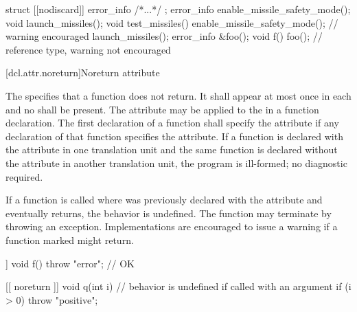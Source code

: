 \pnum
\enterexample
\begin{codeblock}
struct [[nodiscard]] error_info { /*...*/ };
error_info enable_missile_safety_mode();
void launch_missiles();
void test_missiles() {
  enable_missile_safety_mode(); // warning encouraged
  launch_missiles();
}
error_info &foo();
void f() { foo(); } // reference type, warning not encouraged
\end{codeblock}
\exitexample

[dcl.attr.noreturn]{Noreturn attribute}%

\pnum
The   specifies that a function does not return. It
shall appear at most once in each  and no
 shall be present. The attribute may be applied to the
 in a function declaration. The first declaration of a function shall
specify the  attribute if any declaration of that function specifies the
 attribute. If a function is declared with the  attribute in one
translation unit and the same function is declared without the  attribute in another
translation unit, the program is ill-formed; no diagnostic required.

\pnum
If a function  is called where  was previously declared with the 
attribute and  eventually returns, the behavior is undefined. \enternote The function may
terminate by throwing an exception. \exitnote \enternote Implementations are encouraged to issue a
warning if a function marked \tcode{[[noreturn]]} might return. \exitnote

\pnum
\enterexample
\begin{codeblock}
[[ noreturn ]] void f() {
  throw "error";        // OK
}

[[ noreturn ]] void q(int i) { // behavior is undefined if called with an argument 
  if (i > 0)
    throw "positive";
}
\end{codeblock}
\exitexample
